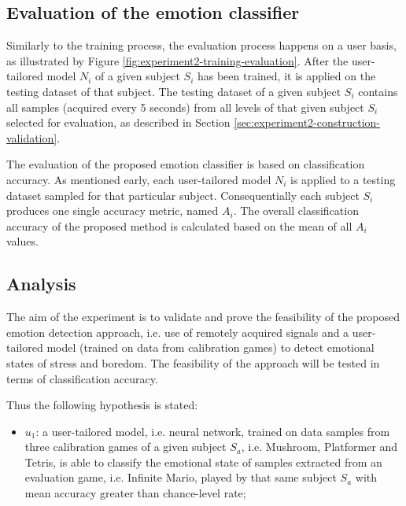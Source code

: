 \subsection{Evaluation of the emotion classifier}

Similarly to the training process, the evaluation process happens on a user basis, as illustrated by Figure \ref{fig:experiment2-training-evaluation}. After the user-tailored model $N_i$ of a given subject $S_i$ has been trained, it is applied on the testing dataset of that subject. The testing dataset of a given subject $S_i$ contains all samples (acquired every 5 seconds) from all levels of that given subject $S_i$ selected for evaluation, as described in Section \ref{sec:experiment2-construction-validation}.

The evaluation of the proposed emotion classifier is based on classification accuracy. As mentioned early, each user-tailored model $N_i$ is applied to a testing dataset sampled for that particular subject. Consequentially each subject $S_i$ produces one single accuracy metric, named $A_i$. The overall classification accuracy of the proposed method is calculated based on the mean of all $A_i$ values.

\subsection{Analysis}

The aim of the experiment is to validate and prove the feasibility of the proposed emotion detection approach, i.e. use of remotely acquired signals and a user-tailored model (trained on data from calibration games) to detect emotional states of stress and boredom. The feasibility of the approach will be tested in terms of classification accuracy.

Thus the following hypothesis is stated:

\begin{itemize}
  \item $u_1$: a user-tailored model, i.e. neural network, trained on data samples from three calibration games of a given subject $S_a$, i.e. Mushroom, Platformer and Tetris, is able to classify the emotional state of samples extracted from an evaluation game, i.e. Infinite Mario, played by that same subject $S_a$ with mean accuracy greater than chance-level rate;
\end{itemize}

